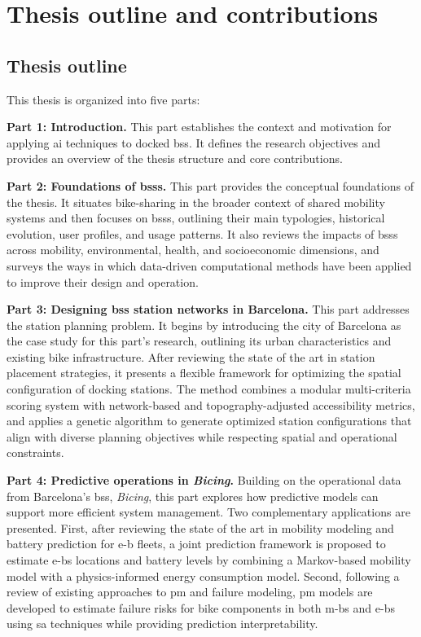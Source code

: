 \section{Thesis outline and contributions}
\label{sec:thesis_outline_and_contributions}

\subsection{Thesis outline}

This thesis is organized into five parts:

\textbf{Part 1: Introduction.}
This part establishes the context and motivation for applying \ac{ai} techniques to docked \ac{bss}. It defines the research objectives and provides an overview of the thesis structure and core contributions.

\textbf{Part 2: Foundations of \acp{bss}.}
This part provides the conceptual foundations of the thesis. It situates bike-sharing in the broader context of shared mobility systems and then focuses on \acp{bss}, outlining their main typologies, historical evolution, user profiles, and usage patterns. It also reviews the impacts of \acp{bss} across mobility, environmental, health, and socioeconomic dimensions, and surveys the ways in which data-driven computational methods have been applied to improve their design and operation.

\textbf{Part 3: Designing \ac{bss} station networks in Barcelona.}
This part addresses the station planning problem. It begins by introducing the city of Barcelona as the case study for this part's research, outlining its urban characteristics and existing bike infrastructure. After reviewing the state of the art in station placement strategies, it presents a flexible framework for optimizing the spatial configuration of docking stations. The method combines a modular multi-criteria scoring system with network-based and topography-adjusted accessibility metrics, and applies a genetic algorithm to generate optimized station configurations that align with diverse planning objectives while respecting spatial and operational constraints.

\textbf{Part 4: Predictive operations in \textit{Bicing}.}  
Building on the operational data from Barcelona’s \ac{bss}, \textit{Bicing}, this part explores how predictive models can support more efficient system management. Two complementary applications are presented. First, after reviewing the state of the art in mobility modeling and battery prediction for \ac{e-b} fleets, a joint prediction framework is proposed to estimate \acp{e-b} locations and battery levels by combining a Markov-based mobility model with a physics-informed energy consumption model. Second, following a review of existing approaches to \ac{pm} and failure modeling, \ac{pm} models are developed to estimate failure risks for bike components in both \acp{m-b} and \acp{e-b} using \ac{sa} techniques while providing prediction interpretability.

